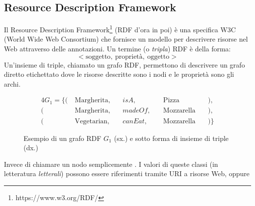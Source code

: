\subsection[Resource Description Framework]{Resource Description Framework}
Il Resource Description Framework\footnote{https://www.w3.org/RDF/} (RDF d'ora in poi) è una specifica W3C (World Wide Web Consortium) che fornisce un modello per descrivere risorse nel Web attraverso delle annotazioni. Un termine (o \emph{tripla}) RDF è della forma:
\[ < \text{soggetto},\ \text{proprietà},\ \text{oggetto} > \]
Un'insieme di triple, chiamato un grafo RDF, permettono di descrivere un grafo diretto etichettato dove le risorse descritte sono i nodi e le proprietà sono gli archi.
\begin{figure}[h]
  \begin{minipage}{0.3\linewidth}
    \centering
  \end{minipage}
  \hspace{5mm}
  \begin{minipage}{0.7\linewidth}
    \begin{alignat*}{4}
      G_1 = \{ (\  & \text{Margherita},\  &  & isA,      &  & \text{Pizza}        &  & ),  \\
      (\           & \text{Margherita},\  &  & madeOf,\  &  & \text{Mozzarella}\  &  & ),  \\
      (\           & \text{Vegetarian},\  &  & canEat,\  &  & \text{Mozzarella}\  &  & )\}
    \end{alignat*}
  \end{minipage}
  \caption{Esempio di un grafo RDF $G_1$ (sx.) e sotto forma di insieme di triple (dx.)}
\end{figure}

Invece di chiamare un nodo semplicemente . I valori di queste classi (in letteratura \emph{letterali}) possono essere riferimenti tramite URI a risorse Web, oppure